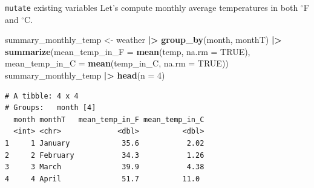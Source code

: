 \documentclass[
  ignorenonframetext,
]{beamer}
\newenvironment{Shaded}{\begin{snugshade}}{\end{snugshade}}
\newcommand{\AttributeTok}[1]{\textcolor[rgb]{0.13,0.29,0.53}{#1}}
\newcommand{\ConstantTok}[1]{\textcolor[rgb]{0.56,0.35,0.01}{#1}}
\newcommand{\DecValTok}[1]{\textcolor[rgb]{0.00,0.00,0.81}{#1}}
\newcommand{\FunctionTok}[1]{\textcolor[rgb]{0.13,0.29,0.53}{\textbf{#1}}}
\newcommand{\NormalTok}[1]{#1}
\newcommand{\OtherTok}[1]{\textcolor[rgb]{0.56,0.35,0.01}{#1}}
\newcommand{\SpecialCharTok}[1]{\textcolor[rgb]{0.81,0.36,0.00}{\textbf{#1}}}
\begin{document}
\begin{frame}[fragile]{\texttt{mutate} existing variables}
\label{mutate-existing-variables-3}
Let's compute monthly average temperatures in both \(^\circ\)F and
\(^\circ\)C.

\normalsize

\begin{Shaded}
\begin{Highlighting}[]
\NormalTok{summary\_monthly\_temp }\OtherTok{\textless{}{-}}\NormalTok{ weather }\SpecialCharTok{|\textgreater{}} 
  \FunctionTok{group\_by}\NormalTok{(month, monthT) }\SpecialCharTok{|\textgreater{}} 
  \FunctionTok{summarize}\NormalTok{(}\AttributeTok{mean\_temp\_in\_F =} \FunctionTok{mean}\NormalTok{(temp, }\AttributeTok{na.rm =} \ConstantTok{TRUE}\NormalTok{), }
            \AttributeTok{mean\_temp\_in\_C =} \FunctionTok{mean}\NormalTok{(temp\_in\_C, }\AttributeTok{na.rm =} \ConstantTok{TRUE}\NormalTok{)) }
\NormalTok{summary\_monthly\_temp }\SpecialCharTok{|\textgreater{}}
  \FunctionTok{head}\NormalTok{(}\AttributeTok{n =} \DecValTok{4}\NormalTok{)}
\end{Highlighting}
\end{Shaded}

\begin{verbatim}
# A tibble: 4 x 4
# Groups:   month [4]
  month monthT   mean_temp_in_F mean_temp_in_C
  <int> <chr>             <dbl>          <dbl>
1     1 January            35.6           2.02
2     2 February           34.3           1.26
3     3 March              39.9           4.38
4     4 April              51.7          11.0 
\end{verbatim}

\normalsize
\end{frame}
\end{document}
